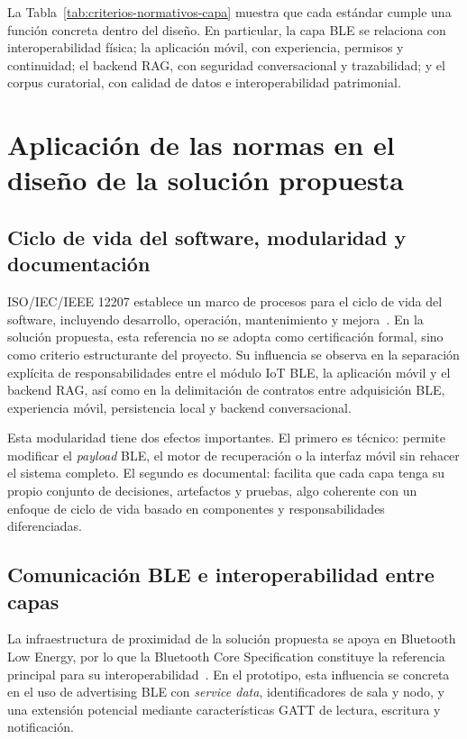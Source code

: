 La Tabla~\ref{tab:criterios-normativos-capa} muestra que cada estándar cumple una función concreta dentro del diseño. En particular, la capa BLE se relaciona con interoperabilidad física; la aplicación móvil, con experiencia, permisos y continuidad; el backend RAG, con seguridad conversacional y trazabilidad; y el corpus curatorial, con calidad de datos e interoperabilidad patrimonial.

\section{Aplicación de las normas en el diseño de la solución propuesta}

\subsection{Ciclo de vida del software, modularidad y documentación}

ISO/IEC/IEEE 12207 establece un marco de procesos para el ciclo de vida del software, incluyendo desarrollo, operación, mantenimiento y mejora~\cite{iso12207}. En la solución propuesta, esta referencia no se adopta como certificación formal, sino como criterio estructurante del proyecto. Su influencia se observa en la separación explícita de responsabilidades entre el módulo IoT BLE, la aplicación móvil y el backend RAG, así como en la delimitación de contratos entre adquisición BLE, experiencia móvil, persistencia local y backend conversacional.

Esta modularidad tiene dos efectos importantes. El primero es técnico: permite modificar el \textit{payload} BLE, el motor de recuperación o la interfaz móvil sin rehacer el sistema completo. El segundo es documental: facilita que cada capa tenga su propio conjunto de decisiones, artefactos y pruebas, algo coherente con un enfoque de ciclo de vida basado en componentes y responsabilidades diferenciadas.

\subsection{Comunicación BLE e interoperabilidad entre capas}

La infraestructura de proximidad de la solución propuesta se apoya en Bluetooth Low Energy, por lo que la Bluetooth Core Specification constituye la referencia principal para su interoperabilidad~\cite{bluetoothcore62}. En el prototipo, esta influencia se concreta en el uso de advertising BLE con \textit{service data}, identificadores de sala y nodo, y una extensión potencial mediante características GATT de lectura, escritura y notificación.

